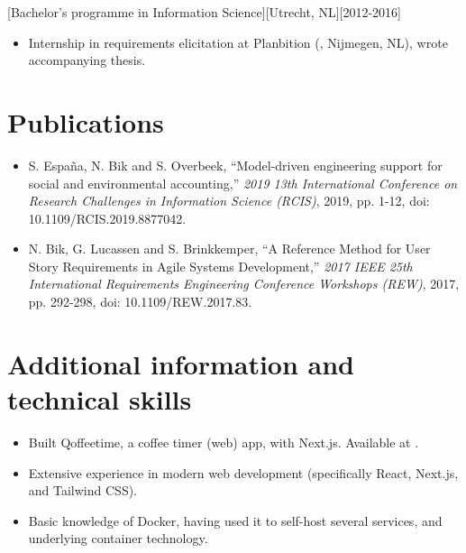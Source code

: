 \documentclass[10pt]{article}
\begin{document}
[Bachelor's programme in Information Science][Utrecht, NL][2012-2016]
\begin{itemize}
    \item Internship in requirements elicitation at Planbition (, Nijmegen, NL), wrote accompanying thesis.
\end{itemize}

\section{Publications}
\label{sec:pubs}

\begin{itemize}
    \item S. España, N. Bik and S. Overbeek, \enquote{Model-driven engineering support for social and environmental accounting,} \textit{2019 13th International Conference on Research Challenges in Information Science (RCIS)}, 2019, pp. 1-12, doi:\\ 10.1109/RCIS.2019.8877042.
    \item N. Bik, G. Lucassen and S. Brinkkemper, \enquote{A Reference Method for User Story Requirements in Agile Systems Development,} \textit{2017 IEEE 25th International Requirements Engineering Conference Workshops (REW)}, 2017, pp. 292-298, doi: 10.1109/REW.2017.83.
\end{itemize}

\section{Additional information and technical skills}
\label{sec:other}

\begin{itemize}
    \item Built Qoffeetime, a coffee timer (web) app, with Next.js. Available at .
    \item Extensive experience in modern web development (specifically React, Next.js, and Tailwind CSS).
    \item Basic knowledge of Docker, having used it to self-host several services, and underlying container technology.
\end{itemize}
\end{document}
